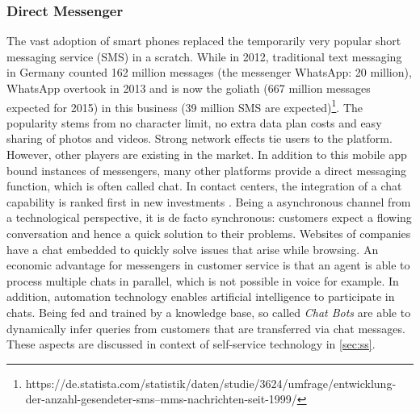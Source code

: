 		\subsubsection{Direct Messenger}
		The vast adoption of smart phones replaced the temporarily very popular short messaging service (SMS) in a scratch.  While in 2012, traditional text messaging in Germany counted 162 million messages (the messenger WhatsApp: 20 million), WhatsApp overtook in 2013 and is now the goliath (667 million messages expected for 2015) in this business (39 million SMS are expected)\footnote{\cf https://de.statista.com/statistik/daten/studie/3624/umfrage/entwicklung- der-anzahl-gesendeter-sms--mms-nachrichten-seit-1999/}. The popularity stems from no character limit, no extra data plan costs and easy sharing of photos and videos. Strong network effects tie users to the platform. However, other players are existing in the market. In addition to this mobile app bound instances of messengers, many other platforms provide a direct messaging function, which is often called chat. In contact centers, the integration of a chat capability is ranked first in new investments \citep{ccnet2016}. Being a asynchronous channel from a technological perspective, it is de facto synchronous: customers expect a flowing conversation and hence a quick solution to their problems. Websites of companies have a chat embedded to quickly solve issues that arise while browsing. An economic advantage for messengers in customer service is that an agent is able to process multiple chats in parallel, which is not possible in voice for example. In addition, automation technology enables artificial intelligence to participate in chats. Being fed and trained by a knowledge base, so called \textit{Chat Bots} are able to dynamically infer queries from customers that are transferred via chat messages. These aspects are discussed in context of self-service technology in \ref{sec:ss}.%
		
